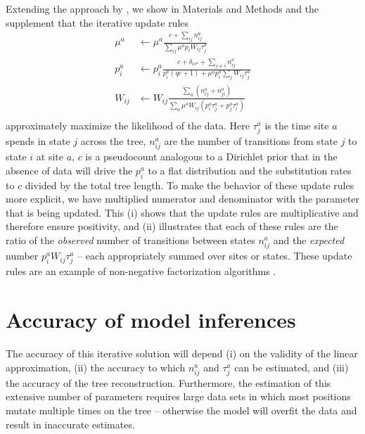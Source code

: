 \documentclass[aps,rmp,twocolumn,linenumbers]{revtex4-1}
\newcommand{\eqp}{p}
\newcommand{\pc}{c}
\begin{document}
Extending the approach by \citet{bruno1996modeling}, we show in Materials and Methods and the supplement that the iterative update rules
\begin{equation}
\label{eq:update}
	\begin{split}
		\mu^a & \leftarrow \mu^a\frac{\pc+\sum_{ij} n^a_{ij}}{\sum_{ij}\mu^a \eqp_{i}W_{ij}\tau_j^a} \\
		\eqp^a_i & \leftarrow \eqp^a_i\frac{\pc+\delta_{is^{a}} + \sum_{j\neq i} n^a_{ij}}{\eqp^a_i(q\pc+1) + \mu^a\eqp^a_i \sum_{j}W_{ij}\tau_j^a} \\
		W_{ij} & \leftarrow W_{ij}\frac{\sum_a (n^a_{ij}+n^a_{ji})}{\sum_a \mu^a W_{ij}(\eqp_i^a\tau_j^a + \eqp_j^a \tau_i^a)} \\
	\end{split}
\end{equation}
approximately maximize the likelihood of the data.
Here $\tau^a_j$ is the time site $a$ spends in state $j$ across the tree, $n^a_{ij}$ are the number of transitions from state $j$ to state $i$ at site $a$,
$\pc$ is a pseudocount analogous to a Dirichlet prior that in the absence of data will drive the $\eqp_i^a$ to a flat distribution and the substitution rates to $\pc$ divided by the total tree length.
To make the behavior of these update rules more explicit, we have multiplied numerator and denominator with the parameter that is being updated.
This (i) shows that the update rules are multiplicative and therefore ensure positivity, and (ii) illustrates that each of these rules are the ratio of the {\it observed} number of transitions between states $n^a_{ij}$ and the {\it expected} number $\eqp^a_i W_{ij}\tau_j^a$ -- each appropriately summed over sites or states.
These update rules are an example of non-negative factorization algorithms \citep{lee_algorithms_2001}.

\section*{Accuracy of model inferences}
The accuracy of this iterative solution will depend (i) on the validity of the linear approximation, (ii) the accuracy to which $n_{ij}^a$ and $\tau_{j}^a$ can be estimated, and (iii) the accuracy of the tree reconstruction.
Furthermore, the estimation of this extensive number of parameters requires large data sets in which most positions mutate multiple times on the tree -- otherwise the model will overfit the data and result in inaccurate estimates.
\end{document}
